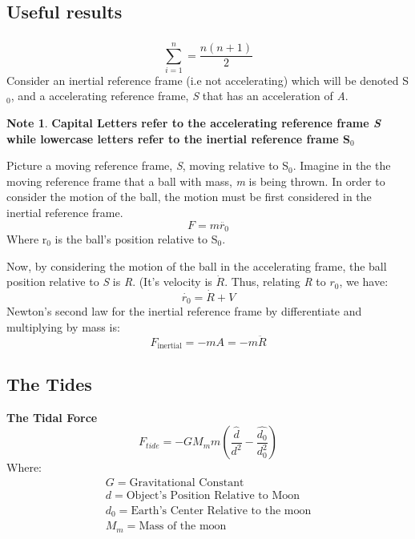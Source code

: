 \documentclass[11pt]{article}
\theoremstyle{definition}
\newtheorem{note}{Note}
\begin{document}
\subsection{Useful results}
\subsubsection{}
\begin{equation}
    \sum_{i=1}^{n} = \frac{n(n+1)}{2}
\end{equation}
Consider an inertial reference frame (i.e not accelerating) which will be denoted S$_0$, and a accelerating reference frame, \textit{S} that has an acceleration of \textit{A}. 
\begin{note}
\textbf{Capital Letters refer to the accelerating reference frame \textit{S} while lowercase letters refer to the inertial reference frame S$_0$}
\end{note}
Picture a moving reference frame, \textit{S}, moving relative to S$_0$. Imagine in the the moving reference frame that a ball with mass, \textit{m} is being thrown. 
In order to consider the motion of the ball, the motion must be first considered in the inertial reference frame. 
\begin{equation}
F = m\ddot{r_0}
\end{equation}
Where r$_0$ is the ball's position relative to S$_0$. 

Now, by considering the motion of the ball in the accelerating frame, the ball position relative to \textit{S} is \textit{R}. (It's velocity is $\dot{R}$. 
Thus, relating \textit{R} to $r_0$, we have: 
\begin{equation}
\dot{r_0} = \dot{R} + V
\end{equation}
Newton's second law for the inertial reference frame by differentiate and multiplying by mass is:
\begin{equation}
F_{\text{inertial}} = -mA = -m\ddot{R}
\end{equation}
\subsection{The Tides}
\begin{shaded}
\textbf{The Tidal Force} \newline
\begin{equation}
F_{tide} = -GM_mm(\frac{\hat{d}}{d^2}-\frac{\hat{d_0}}{d_0^2})
\end{equation}
Where:
\begin{equation*}
\begin{split}
G = \text{Gravitational Constant} \\
d = \text{Object's Position Relative to Moon} \\
d_0 = \text{Earth's Center Relative to the moon}\\
M_m = \text{Mass of the moon}
\end{split}
\end{equation*}
\end{shaded}
\newpage
\end{document}
